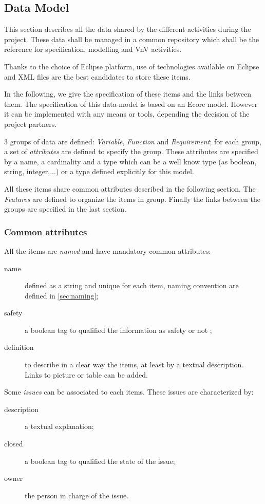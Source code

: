 \subsection{Data Model}
\label{sec:datamodel}

This section describes all the data shared by the different activities during the project.
These data shall be managed in a common repository which shall be the reference for specification, modelling and VnV activities.

Thanks to the choice of Eclipse platform, use of technologies available on Eclipse and XML files are the best candidates to store these items.

In the following, we give the specification of these items and the links between them. The specification of this data-model is based on an Ecore model. However it can be implemented with any means or tools, depending the decision of the project partners.

3 groups of data are defined: \emph{Variable}, \emph{Function} and \emph{Requirement}; for each group, a set of \emph{attributes} are defined to specify the group. These attributes are specified by a name, a cardinality and a type which can be a well  know type  (as boolean, string, integer,...) or a type defined explicitly for this model.

All these items share common attributes described in the following section. The \emph{Features} are defined to organize the items in group.
Finally the links between the groups are specified in the last section.


\subsubsection{Common attributes}

All the items are \textit{named} and have mandatory common attributes:
\begin{description}
\item [name] defined as a string and unique for each item, naming convention are defined in \ref{sec:naming};
\item[safety] a boolean tag to qualified the information as safety or not ;
\item[definition] to describe in a clear way the items, at least by a textual description. Links to picture or table can be added.
\end{description}

Some \textit{issues} can be associated to  each items. These issues are characterized by:
\begin{description}
\item[description] a textual explanation;
\item[closed] a boolean tag to qualified the state of the issue;
\item[owner] the person in charge of the issue.
\end{description}

